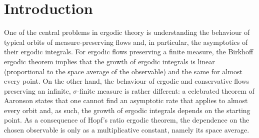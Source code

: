 \documentclass[11pt,letterpaper]{amsart}
\theoremstyle{definition}
\begin{document}
\begin{otherlanguage}{french}
\begin{abstract}
Nous considérons la paramétrisation à vitesse 1 du flot horocyclique sur les revêtements abéliens infinis des surfaces compactes à courbure négative. Nous prouvons un résultat asymptotique pour les intégrales ergodiques de fonctions suffisamment régulières. Notre approche, qui ne repose pas sur la dynamique symbolique, est basée sur une décomposition de Fourier générale pour les revêtements abéliens. Cela nous permet d'étendre les techniques d'opérateurs de transfert au cas du flot géodésique dans un cadre de volume infini. Dans le cas de courbure constante, où les paramétrisations à vitesse 1 et de la contraction uniforme des horocycles coïncident, nous retrouvons un résultat de Ledrappier et Sarig. Enfin, nous déduisons une estimation de la déviation de la puissance pour les moyennes ergodiques des horocycles sur les surfaces compactes, sans condition de pincement comme dans les résultats précédents.
\end{abstract}
\end{otherlanguage}




\setcounter{tocdepth}{1}
\tableofcontents



\section{Introduction}

One of the central problems in ergodic theory is understanding the behaviour of typical orbits of measure-preserving flows and, in particular, the asymptotics of their ergodic integrals. For ergodic flows preserving a finite measure, the Birkhoff ergodic theorem implies that the growth of ergodic integrals is linear (proportional to the space average of the observable) and the same for almost every point. On the other hand, the behaviour of ergodic and conservative flows preserving an infinite, $\sigma$-finite measure is rather different: a celebrated theorem of Aaronson \cite{Aar} states that one cannot find an asymptotic rate that applies to almost every orbit and, as such, the growth of ergodic integrals depends on the starting point. As a consequence of Hopf's ratio ergodic theorem, the dependence on the chosen observable is only as a multiplicative constant, namely its space average.
\end{document}
